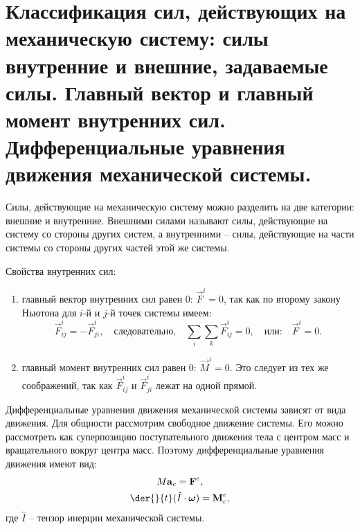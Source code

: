 \chapter{Классификация сил, действующих на механическую систему: силы внутренние
и внешние, задаваемые силы. Главный вектор и главный момент внутренних сил.
Дифференциальные уравнения движения механической системы.}

Силы, действующие на механическую систему можно разделить на две категории:
внешние и внутренние. Внешними силами называют силы, действующие на систему со
стороны других систем, а внутренними -- силы, действующие на части системы со
стороны других частей этой же системы.

Свойства внутренних сил:
\begin{enumerate}
    \item главный вектор внутренних сил равен 0: \( \vec{F}^i = 0 \), так
    как по второму закону Ньютона для \( i \)-й и \( j \)-й точек системы имеем:
    \[
        \vec{F}^i_{ij} = -\vec{F}^i_{ji}, \quad \text{следовательно,}\quad
        \sum_i\sum_k \vec{F}^i_{ij} = 0, \quad \text{или:} \quad
        \vec{F}^i = 0.
    \]
    
    \item главный момент внутренних сил равен 0: \( \vec{M}^i = 0 \). Это
    следует из тех же соображений, так как \( \vec{F}^i_{ij} \) и
    \( \vec{F}^i_{ji} \) лежат на одной прямой.
\end{enumerate}

Дифференциальные уравнения движения механической системы зависят от вида
движения. Для общности рассмотрим свободное движение системы. Его можно
рассмотреть как суперпозицию поступательного движения тела с центром масс и
вращательного вокруг центра масс. Поэтому дифференциальные уравнения движения
имеют вид:
\begin{gather*}
    M\vec{a}_c = \vec{F}^e,\\
    \der{}{t}(\hat{I}\cdot\vec{\omega}) = \vec{M}^e_c,
\end{gather*}
где \( \hat{I} \) -- тензор инерции механической системы.
\newpage
